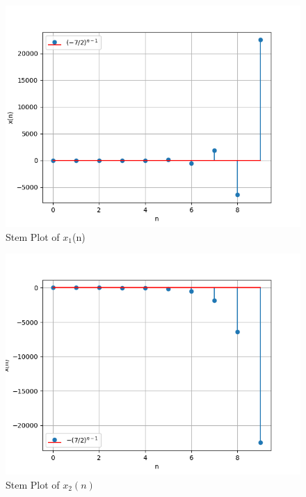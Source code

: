 \documentclass[journal,12pt,twocolumn]{IEEEtran}
\theoremstyle{remark}
\begin{document}
\begin{figure}[h]
    \renewcommand\thefigure{1}
    \centering
    \captionsetup{justification=centering}
    \includegraphics[width=1.1\linewidth]{ncert-maths/11/9/3/6/figs/graph1.png}
    \caption{Stem Plot of $x_1$(n)}
    \label{stemplot1}
\end{figure}
\begin{figure}[h]
    \renewcommand\thefigure{2}
    \centering
    \captionsetup{justification=centering}
    \includegraphics[width=1.1\linewidth]{ncert-maths/11/9/3/6/figs/graph2.png}
    \caption{Stem Plot of $x_2(n)$}
    \label{stemplot2}
\end{figure}
\end{document}
